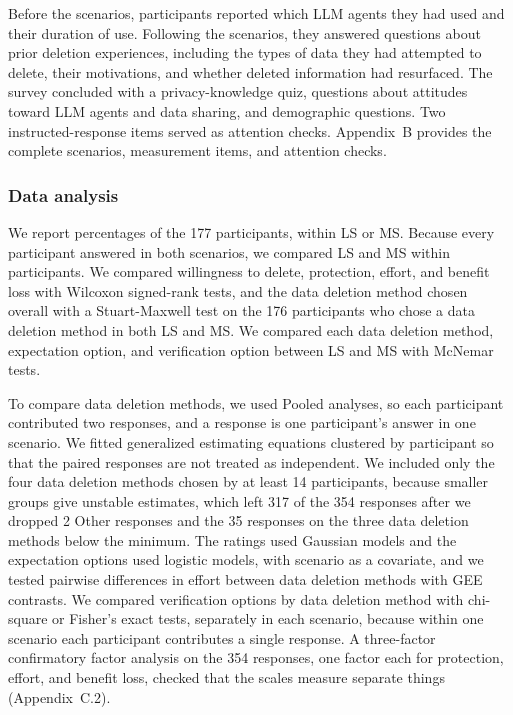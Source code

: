 Before the scenarios, participants reported which LLM agents they had used and their duration of use. Following the scenarios, they answered questions about prior deletion experiences, including the types of data they had attempted to delete, their motivations, and whether deleted information had resurfaced. The survey concluded with a privacy-knowledge quiz, questions about attitudes toward LLM agents and data sharing, and demographic questions. Two instructed-response items served as attention checks. Appendix~B provides the complete scenarios, measurement items, and attention checks.

\subsubsection{Data analysis}

We report percentages of the 177 participants, within LS or MS. Because every participant answered in both scenarios, we compared LS and MS within participants. We compared willingness to delete, protection, effort, and benefit loss with Wilcoxon signed-rank tests, and the data deletion method chosen overall with a Stuart-Maxwell test on the 176 participants who chose a data deletion method in both LS and MS. We compared each data deletion method, expectation option, and verification option between LS and MS with McNemar tests.

To compare data deletion methods, we used Pooled analyses, so each participant contributed two responses, and a response is one participant's answer in one scenario. We fitted generalized estimating equations clustered by participant so that the paired responses are not treated as independent. We included only the four data deletion methods chosen by at least 14 participants, because smaller groups give unstable estimates, which left 317 of the 354 responses after we dropped 2 Other responses and the 35 responses on the three data deletion methods below the minimum. The ratings used Gaussian models and the expectation options used logistic models, with scenario as a covariate, and we tested pairwise differences in effort between data deletion methods with GEE contrasts. We compared verification options by data deletion method with chi-square or Fisher's exact tests, separately in each scenario, because within one scenario each participant contributes a single response. A three-factor confirmatory factor analysis on the 354 responses, one factor each for protection, effort, and benefit loss, checked that the scales measure separate things (Appendix~C.2).

